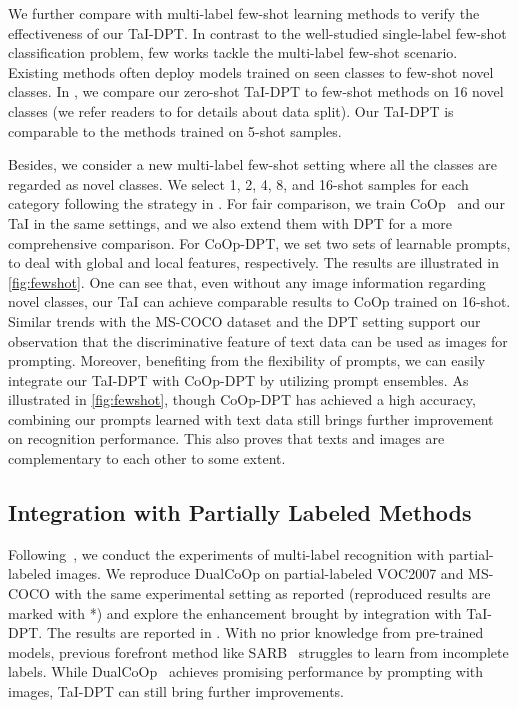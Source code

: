 \documentclass[10pt,twocolumn,letterpaper]{article}
\begin{document}
We further compare with multi-label few-shot learning methods to verify the effectiveness of our TaI-DPT. 
In contrast to the well-studied single-label few-shot classification problem, few works tackle the multi-label few-shot scenario. Existing methods \cite{alfassy2019laso,simon2022meta} often deploy models trained on seen classes to few-shot novel classes. In , we compare our zero-shot TaI-DPT to few-shot methods on 16 novel classes (we refer readers to \cite{alfassy2019laso} for details about data split). Our TaI-DPT is comparable to the methods trained on 5-shot samples.

Besides, we consider a new multi-label few-shot setting where all the classes are regarded as novel classes. We select 1, 2, 4, 8, and 16-shot samples for each category following the strategy in \cite{alfassy2019laso}.
For fair comparison, we train CoOp~\cite{coop} and our TaI in the same settings, and we also extend them with DPT for a more comprehensive comparison. For CoOp-DPT, we set two sets of learnable prompts, to deal with global and local features, respectively.
The results are illustrated in \cref{fig:fewshot}.
One can see that, even without any image information regarding novel classes, our TaI can achieve comparable results to CoOp trained on 16-shot.
Similar trends with the MS-COCO dataset and the DPT setting support our observation that the discriminative feature of text data can be used as images for prompting.
Moreover, benefiting from the flexibility of prompts, we can easily integrate our TaI-DPT with CoOp-DPT by utilizing prompt ensembles. 
As illustrated in \cref{fig:fewshot}, though CoOp-DPT has achieved a high accuracy, combining our prompts learned with text data still brings further improvement on recognition performance.
This also proves that texts and images are complementary to each other to some extent.


\subsection{Integration with Partially Labeled Methods}
\label{e:4}


Following~\cite{dualcoop}, we conduct the experiments of multi-label recognition with partial-labeled images.
We reproduce DualCoOp on partial-labeled VOC2007 and MS-COCO with the same experimental setting as reported (reproduced results are marked with *) and explore the enhancement brought by integration with TaI-DPT. 
The results are reported in . With no prior knowledge from pre-trained models, previous forefront method like SARB~\cite{pu2022semantic} struggles to learn from incomplete labels. While DualCoOp~\cite{dualcoop} achieves promising performance by prompting with images, TaI-DPT can still bring further improvements.
\end{document}
